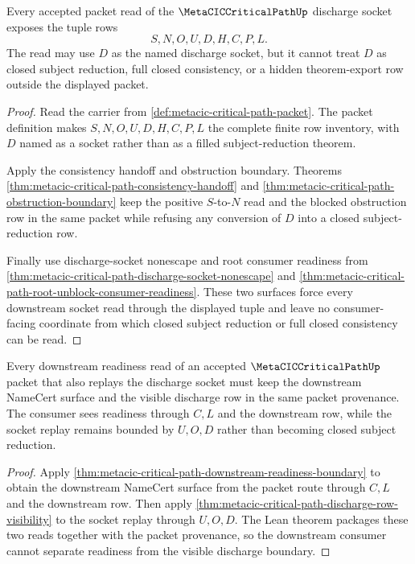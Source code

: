 \begin{theorem}
\label{thm:metacic-critical-path-discharge-socket-totality}
Every accepted packet read of the $\MetaCICCriticalPathUp$ discharge socket exposes the tuple rows
$$
S,N,O,U,D,H,C,P,L.
$$
The read may use $D$ as the named discharge socket, but it cannot treat $D$ as closed subject reduction, full closed consistency, or a hidden theorem-export row outside the displayed packet.
\end{theorem}
\begin{proof}
Read the carrier from \autoref{def:metacic-critical-path-packet}. The packet definition makes $S,N,O,U,D,H,C,P,L$ the complete finite row inventory, with $D$ named as a socket rather than as a filled subject-reduction theorem.

Apply the consistency handoff and obstruction boundary. Theorems \autoref{thm:metacic-critical-path-consistency-handoff} and \autoref{thm:metacic-critical-path-obstruction-boundary} keep the positive $S$-to-$N$ read and the blocked obstruction row in the same packet while refusing any conversion of $D$ into a closed subject-reduction row.

Finally use discharge-socket nonescape and root consumer readiness from \autoref{thm:metacic-critical-path-discharge-socket-nonescape} and \autoref{thm:metacic-critical-path-root-unblock-consumer-readiness}. These two surfaces force every downstream socket read through the displayed tuple and leave no consumer-facing coordinate from which closed subject reduction or full closed consistency can be read.
\end{proof}

\begin{theorem}
\label{thm:metacic-critical-path-downstream-discharge-visibility}
Every downstream readiness read of an accepted $\MetaCICCriticalPathUp$ packet that also replays the discharge socket must keep the downstream NameCert surface and the visible discharge row in the same packet provenance. The consumer sees readiness through $C,L$ and the downstream row, while the socket replay remains bounded by $U,O,D$ rather than becoming closed subject reduction.
\end{theorem}
\begin{proof}
Apply \autoref{thm:metacic-critical-path-downstream-readiness-boundary} to obtain the downstream NameCert surface from the packet route through $C,L$ and the downstream row. Then apply \autoref{thm:metacic-critical-path-discharge-row-visibility} to the socket replay through $U,O,D$. The Lean theorem packages these two reads together with the packet provenance, so the downstream consumer cannot separate readiness from the visible discharge boundary.
\end{proof}

